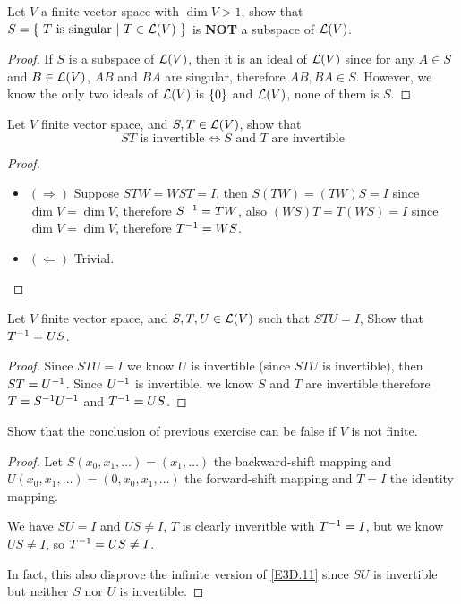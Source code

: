 \documentclass[../main.tex]{subfiles}
\begin{document}
\setcounter{exercise}{3}
\begin{exercise}
  Let $V$ a finite vector space with $\dim V > 1$,
  show that $S = \{ \ T \text{ is singular} \ | \ T \in \mathcal{L}(V) \ \}$ is \textbf{NOT}
  a subspace of $\mathcal{L}(V)$.
\end{exercise}
\begin{proof}
  If $S$ is a subspace of $\mathcal{L}(V)$, then it is an ideal of $\mathcal{L}(V)$ since
  for any $A \in S$ and $B \in \mathcal{L}(V)$, $AB$ and $BA$ are singular,
  therefore $AB, BA \in S$.
  However, we know the only two ideals of $\mathcal{L}(V)$ is $\{0\}$ and $\mathcal{L}(V)$,
  none of them is $S$.
\end{proof}

\setcounter{exercise}{10}
\begin{exercise}
  \label{E3D.11}
  Let $V$ finite vector space, and $S, T \in \mathcal{L}(V)$, show that
  \[
  ST \text{ is invertible} \iff S \text{ and } T \text{ are invertible}
  \]
\end{exercise}
\begin{proof}
  ~
  \begin{itemize}
    \item $(\Rightarrow)$ Suppose $STW = WST = I$,
          then $S(TW) = (TW)S = I$ since $\dim V = \dim V$, therefore $S^{-1} = TW$,
          also $(WS)T = T(WS) = I$ since $\dim V = \dim V$, therefore $T^{-1} = WS$.
    \item $(\Leftarrow)$ Trivial.
  \end{itemize}
\end{proof}

\begin{exercise}
  Let $V$ finite vector space, and $S, T, U \in \mathcal{L}(V)$ such that $STU = I$,
  Show that $T^{-1} = US$.
\end{exercise}
\begin{proof}
  Since $STU = I$ we know $U$ is invertible (since $STU$ is invertible), then $ST = U^{-1}$.
  Since $U^{-1}$ is invertible, we know $S$ and $T$ are invertible therefore $T = S^{-1}U^{-1}$
  and $T^{-1} = US$.
\end{proof}

\begin{exercise}
  Show that the conclusion of previous exercise can be false if $V$ is not finite.
\end{exercise}
\begin{proof}
  Let $S(x_0, x_1, \dots) = (x_1, \dots)$ the backward-shift mapping
  and $U(x_0, x_1, \dots) = (0, x_0, x_1, \dots)$ the forward-shift mapping
  and $T = I$ the identity mapping.

  We have $SU = I$ and $US \neq I$, $T$ is clearly inveritble with $T^{-1} = I$,
  but we know $US \neq I$, so $T^{-1} = US \neq I$.

  In fact, this also disprove the infinite version of \cref{E3D.11} since $SU$ is invertible but neither
  $S$ nor $U$ is invertible.
\end{proof}
\end{document}
